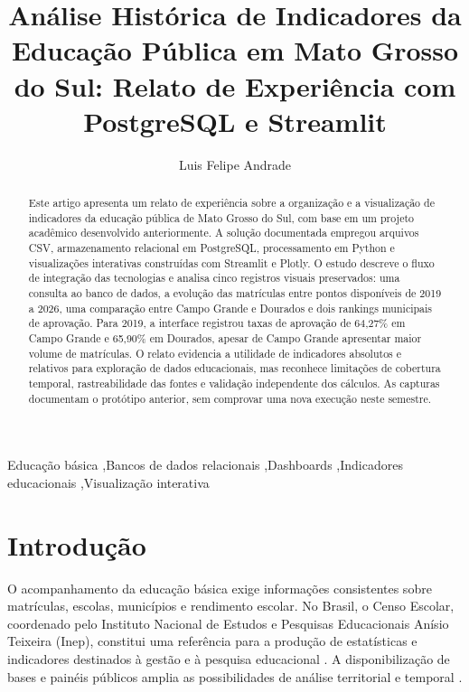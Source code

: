 \documentclass[preprint,10pt,5p]{elsarticle}
\begin{document}
\begin{frontmatter}
\title{Análise Histórica de Indicadores da Educação Pública em Mato Grosso do Sul: Relato de Experiência com PostgreSQL e Streamlit}
\author[ucdb]{Luis Felipe Andrade}
\address[ucdb]{Universidade Católica Dom Bosco, Campo Grande, Mato Grosso do Sul, Brasil}
\begin{abstract}
Este artigo apresenta um relato de experiência sobre a organização e a visualização de indicadores da educação pública de Mato Grosso do Sul, com base em um projeto acadêmico desenvolvido anteriormente. A solução documentada empregou arquivos CSV, armazenamento relacional em PostgreSQL, processamento em Python e visualizações interativas construídas com Streamlit e Plotly. O estudo descreve o fluxo de integração das tecnologias e analisa cinco registros visuais preservados: uma consulta ao banco de dados, a evolução das matrículas entre pontos disponíveis de 2019 a 2026, uma comparação entre Campo Grande e Dourados e dois rankings municipais de aprovação. Para 2019, a interface registrou taxas de aprovação de 64,27\% em Campo Grande e 65,90\% em Dourados, apesar de Campo Grande apresentar maior volume de matrículas. O relato evidencia a utilidade de indicadores absolutos e relativos para exploração de dados educacionais, mas reconhece limitações de cobertura temporal, rastreabilidade das fontes e validação independente dos cálculos. As capturas documentam o protótipo anterior, sem comprovar uma nova execução neste semestre.
\end{abstract}
\begin{keyword}
Educação básica \sep Bancos de dados relacionais \sep Dashboards \sep Indicadores educacionais \sep Visualização interativa
\end{keyword}
\end{frontmatter}

\section{Introdução}
O acompanhamento da educação básica exige informações consistentes sobre matrículas, escolas, municípios e rendimento escolar. No Brasil, o Censo Escolar, coordenado pelo Instituto Nacional de Estudos e Pesquisas Educacionais Anísio Teixeira (Inep), constitui uma referência para a produção de estatísticas e indicadores destinados à gestão e à pesquisa educacional \citep{inep_censo}. A disponibilização de bases e painéis públicos amplia as possibilidades de análise territorial e temporal \citep{inep_paineis}.
\end{document}
